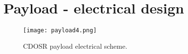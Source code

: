 \section{Payload  - electrical design}\label{AE2}
\begin{figure}[h]
    \centering
    \texttt{[image: payload4.png]}
    \caption{\small{CDOSR payload electrical scheme.}}
\end{figure}
